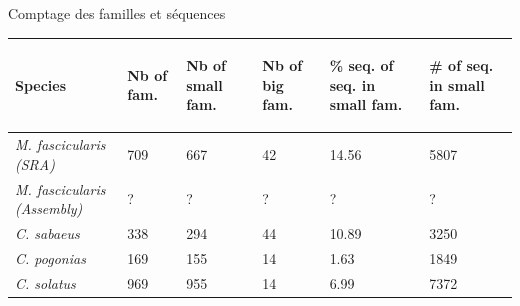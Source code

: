 \documentclass[11pt]{beamer}
\begin{document}
\begin{frame}{Comptage des familles et séquences}  
\begin{center}                    
	\begin{tabular}{|p{2cm}|p{1cm}|p{1cm}|p{1cm}|p{1cm}|p{1cm}|}
	\hline
	\begin{bf}\tiny{Species}\end{bf} & \begin{bf}\tiny{Nb of fam.}\end{bf} & \begin{bf}\tiny{Nb of small fam.}\end{bf} & \begin{bf}\tiny{Nb of big fam.}\end{bf} & \begin{bf} \tiny{\% seq. of seq. in small fam.}\end{bf} & \begin{bf} \tiny{\# of seq. in small fam.} \end{bf} \\
	\hline
	\textit{M. fascicularis 
	(SRA)}                   & 709 & 667 & 42 & 14.56 & 5807  \\
	\hline
	\textit{M. fascicularis 
	(Assembly)}              & ?   & ?   & ?  & ?     &?      \\
	\hline
	\textit{C. sabaeus}      & 338 & 294 & 44 & 10.89 & 3250  \\
	\hline
	\textit{C. pogonias}     & 169 & 155 & 14 & 1.63  & 1849  \\
	\hline
	\textit{C. solatus}      & 969 & 955 & 14 & 6.99  & 7372  \\
	\hline	
	\end{tabular}
\end{center}     
\end{frame}
\end{document}
